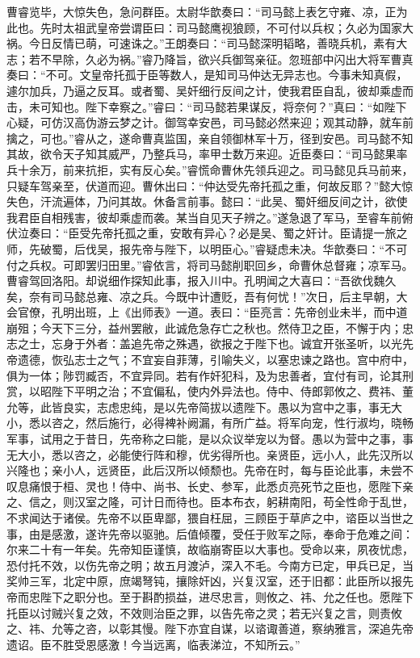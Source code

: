 曹睿览毕，大惊失色，急问群臣。太尉华歆奏曰：“司马懿上表乞守雍、凉，正为此也。先时太祖武皇帝尝谓臣曰：司马懿鹰视狼顾，不可付以兵权；久必为国家大祸。今日反情已萌，可速诛之。”王朗奏曰：“司马懿深明韬略，善晓兵机，素有大志；若不早除，久必为祸。”睿乃降旨，欲兴兵御驾亲征。忽班部中闪出大将军曹真奏曰：“不可。文皇帝托孤于臣等数人，是知司马仲达无异志也。今事未知真假，遽尔加兵，乃逼之反耳。或者蜀、吴奸细行反间之计，使我君臣自乱，彼却乘虚而击，未可知也。陛下幸察之。”睿曰：“司马懿若果谋反，将奈何？”真曰：“如陛下心疑，可仿汉高伪游云梦之计。御驾幸安邑，司马懿必然来迎；观其动静，就车前擒之，可也。”睿从之，遂命曹真监国，亲自领御林军十万，径到安邑。司马懿不知其故，欲令天子知其威严，乃整兵马，率甲士数万来迎。近臣奏曰：“司马懿果率兵十余万，前来抗拒，实有反心矣。”睿慌命曹休先领兵迎之。司马懿见兵马前来，只疑车驾亲至，伏道而迎。曹休出曰：“仲达受先帝托孤之重，何故反耶？”懿大惊失色，汗流遍体，乃问其故。休备言前事。懿曰：“此吴、蜀奸细反间之计，欲使我君臣自相残害，彼却乘虚而袭。某当自见天子辨之。”遂急退了军马，至睿车前俯伏泣奏曰：“臣受先帝托孤之重，安敢有异心？必是吴、蜀之奸计。臣请提一旅之师，先破蜀，后伐吴，报先帝与陛下，以明臣心。”睿疑虑未决。华歆奏曰：“不可付之兵权。可即罢归田里。”睿依言，将司马懿削职回乡，命曹休总督雍；凉军马。曹睿驾回洛阳。却说细作探知此事，报入川中。孔明闻之大喜曰：“吾欲伐魏久矣，奈有司马懿总雍、凉之兵。今既中计遭贬，吾有何忧！”次日，后主早朝，大会官僚，孔明出班，上《出师表》一道。表曰：“臣亮言：先帝创业未半，而中道崩殂；今天下三分，益州罢敝，此诚危急存亡之秋也。然侍卫之臣，不懈于内；忠志之士，忘身于外者：盖追先帝之殊遇，欲报之于陛下也。诚宜开张圣听，以光先帝遗德，恢弘志士之气；不宜妄自菲薄，引喻失义，以塞忠谏之路也。宫中府中，俱为一体；陟罚臧否，不宜异同。若有作奸犯科，及为忠善者，宜付有司，论其刑赏，以昭陛下平明之治；不宜偏私，使内外异法也。侍中、侍郎郭攸之、费祎、董允等，此皆良实，志虑忠纯，是以先帝简拔以遗陛下。愚以为宫中之事，事无大小，悉以咨之，然后施行，必得裨补阙漏，有所广益。将军向宠，性行淑均，晓畅军事，试用之于昔日，先帝称之曰能，是以众议举宠以为督。愚以为营中之事，事无大小，悉以咨之，必能使行阵和穆，优劣得所也。亲贤臣，远小人，此先汉所以兴隆也；亲小人，远贤臣，此后汉所以倾颓也。先帝在时，每与臣论此事，未尝不叹息痛恨于桓、灵也！侍中、尚书、长史、参军，此悉贞亮死节之臣也，愿陛下亲之、信之，则汉室之隆，可计日而待也。臣本布衣，躬耕南阳，苟全性命于乱世，不求闻达于诸侯。先帝不以臣卑鄙，猥自枉屈，三顾臣于草庐之中，谘臣以当世之事，由是感激，遂许先帝以驱驰。后值倾覆，受任于败军之际，奉命于危难之间：尔来二十有一年矣。先帝知臣谨慎，故临崩寄臣以大事也。受命以来，夙夜忧虑，恐付托不效，以伤先帝之明；故五月渡泸，深入不毛。今南方已定，甲兵已足，当奖帅三军，北定中原，庶竭弩钝，攘除奸凶，兴复汉室，还于旧都：此臣所以报先帝而忠陛下之职分也。至于斟酌损益，进尽忠言，则攸之、祎、允之任也。愿陛下托臣以讨贼兴复之效，不效则治臣之罪，以告先帝之灵；若无兴复之言，则责攸之、祎、允等之咨，以彰其慢。陛下亦宜自谋，以谘诹善道，察纳雅言，深追先帝遗诏。臣不胜受恩感激！今当远离，临表涕泣，不知所云。”

